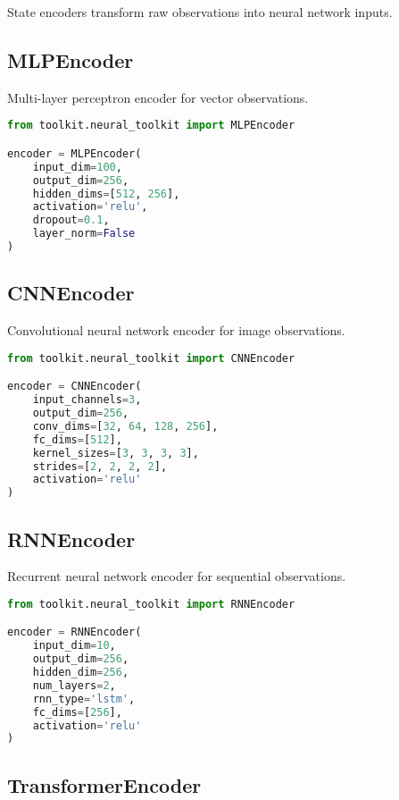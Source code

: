 State encoders transform raw observations into neural network inputs.

\subsection{MLPEncoder}

Multi-layer perceptron encoder for vector observations.

\begin{lstlisting}[language=python, caption=MLP Encoder]
from toolkit.neural_toolkit import MLPEncoder

encoder = MLPEncoder(
    input_dim=100,
    output_dim=256,
    hidden_dims=[512, 256],
    activation='relu',
    dropout=0.1,
    layer_norm=False
)
\end{lstlisting}

\subsection{CNNEncoder}

Convolutional neural network encoder for image observations.

\begin{lstlisting}[language=python, caption=CNN Encoder]
from toolkit.neural_toolkit import CNNEncoder

encoder = CNNEncoder(
    input_channels=3,
    output_dim=256,
    conv_dims=[32, 64, 128, 256],
    fc_dims=[512],
    kernel_sizes=[3, 3, 3, 3],
    strides=[2, 2, 2, 2],
    activation='relu'
)
\end{lstlisting}

\subsection{RNNEncoder}

Recurrent neural network encoder for sequential observations.

\begin{lstlisting}[language=python, caption=RNN Encoder]
from toolkit.neural_toolkit import RNNEncoder

encoder = RNNEncoder(
    input_dim=10,
    output_dim=256,
    hidden_dim=256,
    num_layers=2,
    rnn_type='lstm',
    fc_dims=[256],
    activation='relu'
)
\end{lstlisting}

\subsection{TransformerEncoder}

